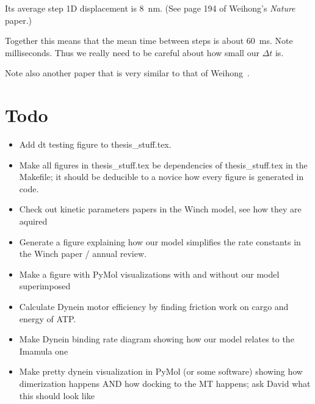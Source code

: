 \documentclass[10pt]{article} %
\begin{document}
Its average step 1D displacement is 8~nm. (See page 194 of Weihong's \emph{Nature} paper.)

Together this means that the mean time between steps is about 60~ms.
Note milliseconds.  Thus we really need to be careful about how small
our $\Delta t$ is.

Note also another paper that is very similar to that of Weihong~\cite{dewitt2012cytoplasmic}.



\section{Todo}
\begin{itemize}
\item Add dt testing figure to thesis\_stuff.tex.
\item Make all figures in thesis\_stuff.tex be dependencies of thesis\_stuff.tex in the Makefile; it should be deducible to a novice how every figure is generated in code.
\item Check out kinetic parameters papers in the Winch model, see how they are aquired
\item Generate a figure explaining how our model simplifies the rate constants in the Winch paper / annual review.
\item Make a figure with PyMol visualizations with and without our model superimposed
\item Calculate Dynein motor efficiency by finding friction work on cargo and energy of ATP.
\item Make Dynein binding rate diagram showing how our model relates to the Imamula one
\item Make pretty dynein visualization in PyMol (or some software) showing how dimerization happens AND how docking to the MT happens; ask David what this should look like
\end{itemize}



\end{document}
